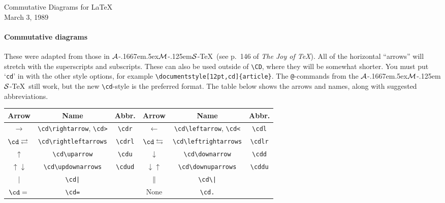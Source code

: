 \nofiles

\addtolength{\textwidth}{1in}
\addtolength{\oddsidemargin}{-.5in}

\newcommand{\AmSTeX}{$\cal A$\kern-.1667em\lower.5ex\hbox
 {$\cal M$}\kern-.125em{$\cal S$}-\TeX}

\newcommand{\cdrl}{\cd\rightleftarrows}
\newcommand{\cdlr}{\cd\leftrightarrows}
\newcommand{\cdr}{\cd\rightarrow}
\newcommand{\cdl}{\cd\leftarrow}
\newcommand{\cdu}{\cd\uparrow}
\newcommand{\cdd}{\cd\downarrow}
\newcommand{\cdud}{\cd\updownarrows}
\newcommand{\cddu}{\cd\downuparrows}


\thispagestyle{empty}
\begin{center}
{\Large Commutative Diagrams for \LaTeX} \\
March 3, 1989
\end{center}

\paragraph{Commutative diagrams} These were adapted from those in \AmSTeX\
(see p.\ 146 of {\em The Joy of \TeX}). All of the horizontal ``arrows'' will
stretch with the superscripts and subscripts. These can also be used outside
of \verb"\CD", where they will be somewhat shorter. You must put `{\tt cd}'
in with the other style options, for example
\verb"\documentstyle[12pt,cd]{article}".  The \verb"@"-commands from the
\AmSTeX\ still work, but the new \verb"\cd"-style is the preferred format.
The table below shows the arrows and names, along with suggested
abbreviations.

\begin{center}
\begin{tabular}{|c|c|c||c|c|c|} \hline
Arrow & Name & Abbr. & Arrow & Name & Abbr.\\ \hline
$\rightarrow$ & \verb"\cd\rightarrow", \verb"\cd>" & \verb"\cdr" &
        $\leftarrow$ & \verb"\cd\leftarrow", \verb"\cd<" & \verb"\cdl" \\
$\cd\rightleftarrows {}{}$ &\verb"\cd\rightleftarrows" &\verb"\cdrl" &
        $\cd\leftrightarrows{}{}$ &\verb"\cd\leftrightarrows"
        &\verb"\cdlr" \\
$\uparrow$ &\verb"\cd\uparrow" & \verb"\cdu" &
        $\downarrow$ &\verb"\cd\downarrow" &\verb"\cdd" \\
$\uparrow\downarrow$ &\verb"\cd\updownarrows" & \verb"\cdud" &
        $\downarrow\uparrow$ &\verb"\cd\downuparrows" &\verb"\cddu" \\
        $|$ & \verb"\cd|" && $\|$ & \verb"\cd\|" & \\
$\cd={}{}$ & \verb"\cd=" && None & \verb"\cd." &  \\
\hline
\end{tabular}
\end{center}

